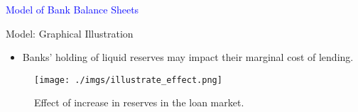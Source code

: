 \documentclass[notes,11pt, aspectratio=169]{beamer}
\begin{document}





\begin{frame}
    \textcolor{blue}{\huge{\centerline{Model of Bank Balance Sheets}}}

\end{frame}

\begin{frame}{Model: Graphical Illustration}
    \vspace{0.5cm}
      \begin{itemize}
        \item Banks' holding of liquid reserves may impact their marginal cost of lending. 
    
      \end{itemize}
      
        \begin{figure}[t*]
          \centering
    
          \texttt{[image: ./imgs/illustrate\_effect.png]}
        \caption{Effect of increase in reserves in the loan market. }
        \end{figure}
        
      \end{frame}
    



\end{document}
